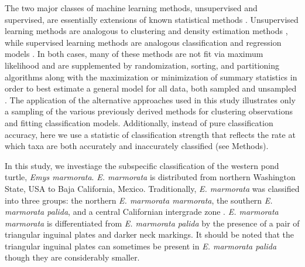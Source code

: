 \documentclass[12pt,letterpaper]{article}\usepackage{graphicx, color}
\begin{document}
The two major classes of machine learning methods, unsupervised and supervised, are essentially extensions of known statistical methods \citep{Hastie2009}. Unsupervised learning methods are analogous to clustering and density estimation methods \citep{Kaufman1990}, while supervised learning methods are analogous classification and regression models \citep{Breiman1984}. In both cases, many of these methods are not fit via maximum likelihood and are supplemented by randomization, sorting, and partitioning algorithms along with the maximization or minimization of summary statistics in order to best estimate a general model for all data, both sampled and unsampled \citep{Hastie2009}. The application of the alternative approaches used in this study illustrates only a sampling of the various previously derived methods for clustering observations and fitting classification models. 
Additionally, instead of pure classification accuracy, here we use a statistic of classification strength that reflects the rate at which taxa are both accurately and inaccurately classified (see Methods).


In this study, we investiage the subspecific classification of the western pond turtle, \textit{Emys marmorata}. \textit{E. marmorata} is distributed from northern Washington State, USA to Baja California, Mexico.
Traditionally, \textit{E. marmorata} was classified into three groups: the northern \textit{E. marmorata marmorata}, the southern \textit{E. marmorata palida}, and a central Californian intergrade zone \citep{Seeliger1945,Holland1992}. \textit{E. marmorata marmorata} is differentiated from \textit{E. marmorata palida} by the presence of a pair of triangular inguinal plates and darker neck markings. It should be noted that the triangular inguinal plates can sometimes be present in \textit{E. marmorata palida} though they are considerably smaller.
\end{document}

